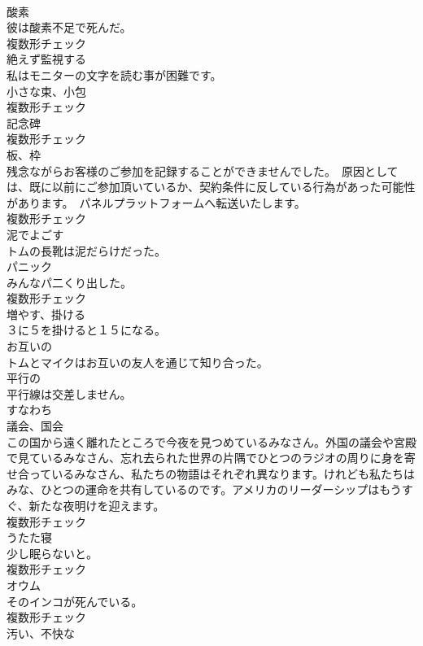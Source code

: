 \documentclass[8pt]{extreport}
\begin{document}
\begin{CJK}{UTF8}{min}
\\	[名詞]	酸素	
\\	彼は酸素不足で死んだ。	
\\	複数形チェック
\\	[動詞]	絶えず監視する	
\\	私はモニターの文字を読む事が困難です。	
\\	[名詞]	小さな束、小包	
\\	複数形チェック
\\	[名詞]	記念碑	
\\	複数形チェック
\\	[名詞]	板、枠	
\\	残念ながらお客様のご参加を記録することができませんでした。　原因としては、既に以前にご参加頂いているか、契約条件に反している行為があった可能性があります。　パネルプラットフォームへ転送いたします。	
\\	複数形チェック
\\	[形容詞]	泥でよごす	
\\	トムの長靴は泥だらけだった。	
\\	[名詞]	パニック	
\\	みんなパ二くり出した。	
\\	複数形チェック
\\	[動詞]	増やす、掛ける	
\\	３に５を掛けると１５になる。	
\\	[形容詞]	お互いの	
\\	トムとマイクはお互いの友人を通じて知り合った。	
\\	[形容詞]	平行の	
\\	平行線は交差しません。	
\\	[副詞]	すなわち	
\\	[名詞]	議会、国会	
\\	この国から遠く離れたところで今夜を見つめているみなさん。外国の議会や宮殿で見ているみなさん、忘れ去られた世界の片隅でひとつのラジオの周りに身を寄せ合っているみなさん、私たちの物語はそれぞれ異なります。けれども私たちはみな、ひとつの運命を共有しているのです。アメリカのリーダーシップはもうすぐ、新たな夜明けを迎えます。	
\\	複数形チェック
\\	[名詞]	うたた寝	
\\	少し眠らないと。	
\\	複数形チェック
\\	[名詞]	オウム	
\\	そのインコが死んでいる。	
\\	複数形チェック
\\	[形容詞]	汚い、不快な	

\end{CJK}
\end{document}
